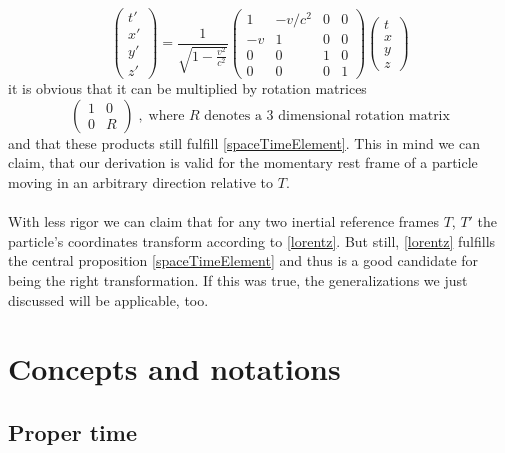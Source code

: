 \documentclass{article}
\begin{document}
\begin{equation}
\left(\begin{array}{c}
              t'
              \\
              x'
              \\
              y'
              \\
              z'
\end{array} \right)
=
\frac{1}{\sqrt{1 - \frac{v^2}{c^2}}}
\begin{pmatrix}
    1 & -v/c^2 & 0 & 0
    \\
    -v & 1 & 0 & 0
    \\
    0 & 0 & 1 & 0
    \\
    0 & 0 & 0 & 1
\end{pmatrix}
\left(\begin{array}{c}
          t
          \\
          x
          \\
          y
          \\
          z
\end{array} \right)
\end{equation}
it is obvious that it can be multiplied by rotation matrices
\begin{equation}
\begin{pmatrix}
    1 & 0
    \\
    0 & R
\end{pmatrix}
\;,\; \text{where $R$ denotes a 3 dimensional rotation matrix}
\end{equation}
and that these products still fulfill \ref{spaceTimeElement}.
This in mind we can claim, that our derivation is valid for the momentary rest frame of a particle moving in an arbitrary direction relative to $T$.
\\
\\
With less rigor we can claim that for any two inertial reference frames $T$, $T'$ the particle's coordinates transform according to \ref{lorentz}.
But still, \ref{lorentz} fulfills the central proposition \ref{spaceTimeElement} and thus is a good candidate for being the right transformation.
If this was true, the generalizations we just discussed will be applicable, too.


\section{Concepts and notations}

\subsection{Proper time} \label{sectionProperTime}
\end{document}
